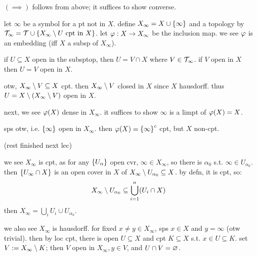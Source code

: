 \begin{pf}[source=Primary Source Material]
    $(\implies)$ follows from above; it suffices to show converse.

    let $\infty$ be a symbol for a pt not in $X$.
    define $X_{\infty}=X\cup\left\{{\infty}\right\}$ and a topology by
    $\mathcal{T}_{\infty}=\mathcal{T}\cup\left\{{X_{\infty}\setminus U \textrm{ cpt in } X}\right\}$.
    let $\varphi:X\rightarrow X_{\infty}$ be the inclusion map.
    we see $\varphi$ is an embedding (iff $X$ a subsp of $X_{\infty}$).

    \begin{block}
        if $U\subseteq X$ open in the subsptop, then $U=V\cap X$ where
        $V\in\mathcal{T}_{\infty}$.
        if $V$ open in $X$ then $U=V$ open in $X$.

        otw, $X_{\infty}\setminus V\subseteq X$ cpt.
        then $X_{\infty}\setminus V$ closed in $X$ since $X$ hausdorff.
        thus $U=X\setminus(X_{\infty}\setminus V)$ open in $X$.
    \end{block}

    next, we see $\varphi(X)$ dense in $X_{\infty}$.
    it suffices to show $\infty$ is a limpt of $\varphi(X)=X$.

    \begin{block}
        sps otw, i.e. $\left\{{\infty}\right\}$ open in $X_{\infty}$.
        then $\varphi(X)=\left\{{\infty}\right\}^{c}$ cpt, but $X$ non-cpt.
    \end{block}
    (rest finished next lec)

    we see $X_{\infty}$ is cpt, as for any $\left\{{U_{\alpha}}\right\}$ open cvr,
    $\infty\in X_{\infty}$, so there is $\alpha_{0}$ s.t.
    $\infty\in U_{\alpha_{0}}$.
    then $\left\{{U_{\infty}\cap X}\right\}$ is an open cover in $X$ of
    $X_{\infty}\setminus U_{\alpha_{0}}\subseteq X$.
    by defn, it is cpt, so:
    \begin{equation*}
        X_{\infty}\setminus U_{\alpha_{0}} \subseteq \bigcup_{i=1}^{n}(U_{i}\cap X)
    \end{equation*}
    then $X_{\infty}=\bigcup_{i}U_{i}\cup U_{\alpha_{0}}$.

    we also see $X_{\infty}$ is hausdorff.
    for fixed $x\neq y\in X_{\infty}$, sps $x\in X$ and $y=\infty$ (otw trivial).
    then by loc cpt, there is open $U\subseteq X$ and cpt $K\subseteq X$ s.t.
    $x\in U\subseteq K$.
    set $V:=X_{\infty}\setminus K$; then $V$ open in $X_{\infty}, y\in V$, and
    $U\cap V=\varnothing$.
\end{pf}

